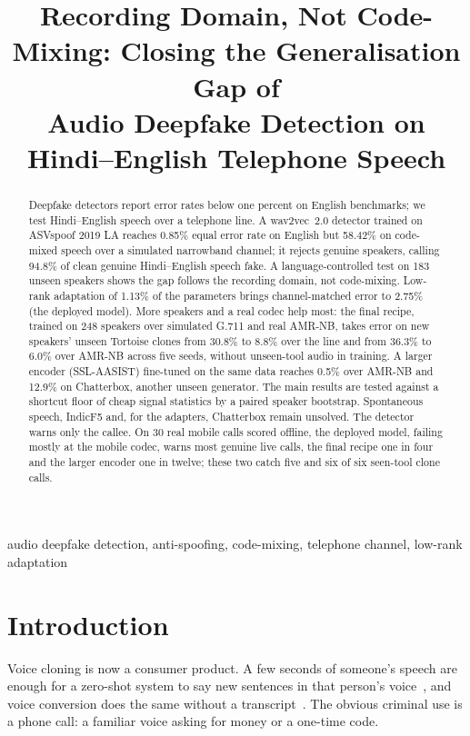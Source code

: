 \documentclass[conference]{IEEEtran}
\begin{document}
\title{Recording Domain, Not Code-Mixing: Closing the Generalisation Gap of\\
Audio Deepfake Detection on Hindi--English Telephone Speech}

\maketitle

\begin{abstract}
Deepfake detectors report error rates below one percent on English benchmarks; we
test Hindi--English speech over a telephone line. A
wav2vec~2.0 detector trained on ASVspoof 2019 LA
reaches 0.85\% equal error rate on English but 58.42\% on code-mixed speech over a
simulated narrowband channel; it rejects genuine speakers, calling 94.8\% of clean genuine
Hindi--English speech fake. A language-controlled
test on 183 unseen speakers shows the gap follows the recording domain, not
code-mixing. Low-rank adaptation of 1.13\% of the parameters brings channel-matched error to
2.75\% (the deployed model). More speakers and a real codec help most: the final
recipe, trained on 248 speakers over simulated G.711 and real AMR-NB, takes error on new
speakers' unseen Tortoise clones from 30.8\% to 8.8\% over the line and from 36.3\% to 6.0\%
over AMR-NB across five seeds, without unseen-tool audio in training. A larger encoder
(SSL-AASIST) fine-tuned on the same data reaches 0.5\% over AMR-NB and 12.9\% on Chatterbox,
another unseen generator. The main results are tested against a shortcut floor of cheap
signal statistics by a paired speaker bootstrap. Spontaneous speech, IndicF5 and, for the adapters, Chatterbox
remain unsolved. The detector warns only the callee. On 30 real mobile
calls scored offline, the deployed model, failing mostly at the mobile codec, warns most
genuine live calls, the final recipe one in four and the larger encoder one in twelve; these two
catch five and six of six seen-tool clone calls.
\end{abstract}

\begin{IEEEkeywords}
audio deepfake detection, anti-spoofing, code-mixing, telephone channel, low-rank adaptation
\end{IEEEkeywords}

\section{Introduction}

Voice cloning is now a consumer product. A few seconds of someone's speech are enough for
a zero-shot system to say new sentences in that person's voice~\cite{casanova2024xtts,
betker2023tortoise}, and voice conversion does the same without a
transcript~\cite{rvc2023}. The obvious criminal use is a phone call: a familiar voice
asking for money or a one-time code.
\end{document}
